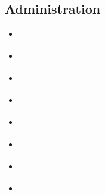 \documentclass[letterpaper,10pt,french]{sphinxmanual}
\begin{document}
\subsection{Administration}
\label{\detokenize{doc_admin/catalogue:administration}}
\begin{sphinxShadowBox}
\begin{itemize}
\item {} 
\sphinxAtStartPar
{}\label{\detokenize{doc_admin/catalogue:id5}}{\hyperref[\detokenize{doc_admin/catalogue:metadonnees-et-modeles}]{}}

\item {} 
\sphinxAtStartPar
{}\label{\detokenize{doc_admin/catalogue:id6}}{\hyperref[\detokenize{doc_admin/catalogue:utilisateur-et-groupe}]{}}

\item {} 
\sphinxAtStartPar
{}\label{\detokenize{doc_admin/catalogue:id7}}{\hyperref[\detokenize{doc_admin/catalogue:moissonnage}]{}}

\item {} 
\sphinxAtStartPar
{}\label{\detokenize{doc_admin/catalogue:id8}}{\hyperref[\detokenize{doc_admin/catalogue:statistique-et-statut}]{}}

\item {} 
\sphinxAtStartPar
{}\label{\detokenize{doc_admin/catalogue:id9}}{\hyperref[\detokenize{doc_admin/catalogue:rapports}]{}}

\item {} 
\sphinxAtStartPar
{}\label{\detokenize{doc_admin/catalogue:id10}}{\hyperref[\detokenize{doc_admin/catalogue:thesaurus}]{}}

\item {} 
\sphinxAtStartPar
{}\label{\detokenize{doc_admin/catalogue:id11}}{\hyperref[\detokenize{doc_admin/catalogue:parametres}]{}}

\item {} 
\sphinxAtStartPar
{}\label{\detokenize{doc_admin/catalogue:id12}}{\hyperref[\detokenize{doc_admin/catalogue:outils}]{}}

\end{itemize}
\end{sphinxShadowBox}
\end{document}

